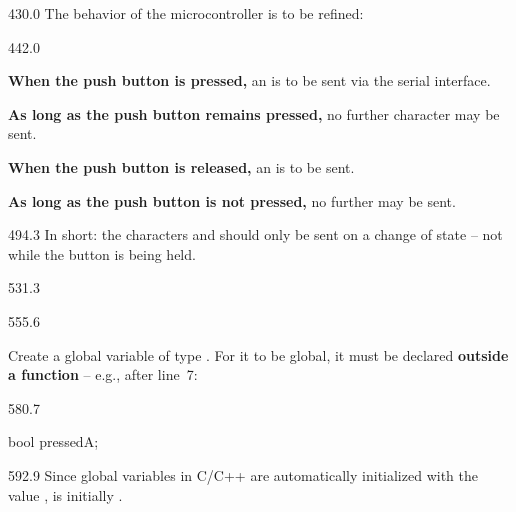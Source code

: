 \documentclass{aslab}
\makeatletter
\newcommand*\aI[1]{\textcolor{codegreen}{#1}}%
\newenvironment{asmlisting}[1][11]{\par
  \edef\asm@bs{\the\baselineskip}\fontsize{#1bp}{\asm@bs}\selectfont
  \ttfamily\asm@setup}{\par}
\makeatother
\begin{document}
\begin{region}{430.0}
The behavior of the microcontroller is to be refined:
\end{region}

\begin{region}[pitch=13.03]{442.0}
\begin{dashlist}
\item \textbf{When the push button is pressed,} an  is to be sent
  via the serial interface.
\item \textbf{As long as the push button remains pressed,} no further
  character may be sent.
\item \textbf{When the push button is released,} an  is to be
  sent.
\item \textbf{As long as the push button is not pressed,} no further
   may be sent.
\end{dashlist}
\end{region}

\begin{region}[pitch=12.1]{494.3}
In short: the characters  and  should only be sent on a
change of state -- not while the button is being held.
\end{region}

\begin{region}{531.3}
\end{region}

\begin{region}[pitch=13]{555.6}
\begin{numlist}
\item Create a global variable  of type . For it
  to be global, it must be declared \textbf{outside a function} -- e.g.,
  after line~7:
\end{numlist}
\end{region}

\begin{region}[x=74.7,right=0]{580.7}
\begin{asmlisting}[9]
\aI{bool} pressedA;
\end{asmlisting}
\end{region}

\begin{region}[x=74.7,right=0,pitch=12.3]{592.9}
Since global variables in C/C++ are automatically initialized with the
value ,  is initially .
\end{region}
\end{document}
